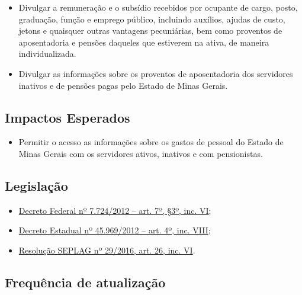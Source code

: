 \documentclass[]{book}
\providecommand{\tightlist}{%
  \setlength{\itemsep}{0pt}\setlength{\parskip}{0pt}}
\begin{document}
\begin{itemize}
\tightlist
\item
  Divulgar a remuneração e o subsídio recebidos por ocupante de cargo, posto, graduação, função e emprego público, incluindo auxílios, ajudas de custo, jetons e quaisquer outras vantagens pecuniárias, bem como proventos de aposentadoria e pensões daqueles que estiverem na ativa, de maneira individualizada.
\item
  Divulgar as informações sobre os proventos de aposentadoria dos servidores inativos e de pensões pagas pelo Estado de Minas Gerais.
\end{itemize}

\hypertarget{impactos-esperados-8}{%
\subsection{Impactos Esperados}\label{impactos-esperados-8}}

\begin{itemize}
\tightlist
\item
  Permitir o acesso as informações sobre os gastos de pessoal do Estado de Minas Gerais com os servidores ativos, inativos e com pensionistas.
\end{itemize}

\hypertarget{legislauxe7uxe3o-8}{%
\subsection{Legislação}\label{legislauxe7uxe3o-8}}

\begin{itemize}
\tightlist
\item
  \href{http://www.planalto.gov.br/ccivil_03/_ato2011-2014/2012/decreto/d7724.htm\#art7}{Decreto Federal nº 7.724/2012 -- art. 7º, §3º, inc. VI};
\item
  \href{https://www.almg.gov.br/consulte/legislacao/completa/completa.html?tipo=DEC\&num=45969\&ano=2012}{Decreto Estadual nº 45.969/2012 -- art. 4º, inc. VIII};
\item
  \href{http://www.planejamento.mg.gov.br/sites/default/files/documentos/resolucao_sitios_seplag_29_de_05_07_2016_1.pdf}{Resolução SEPLAG nº 29/2016, art. 26, inc. VI}.
\end{itemize}

\hypertarget{frequuxeancia-de-atualizauxe7uxe3o-7}{%
\subsection{Frequência de atualização}\label{frequuxeancia-de-atualizauxe7uxe3o-7}}
\end{document}
